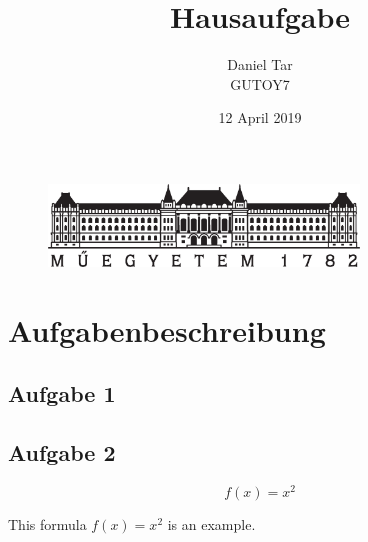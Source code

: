 \documentclass{article}
\begin{document}
	
\setlength{\headheight}{20pt}
\vspace{15cm}
\title{\huge Hausaufgabe
		}
\author{Daniel Tar\\GUTOY7}
\date{12 April 2019}
\maketitle
\thispagestyle{fancy}

\begin{figure}
	\begin{center}
		\includegraphics[height=2.2cm]{logo_bme_kicsi.eps}
	\end{center}
\end{figure}

\newpage
\setlength{\headheight}{0pt}
\tableofcontents

\section{Aufgabenbeschreibung}
\subsection{Aufgabe 1}
\subsection{Aufgabe 2}

\begin{equation}
	f(x)=x^2
\end{equation}

This formula $f(x) = x^2$ is an example.
\lipsum[1-9]
\end{document}
